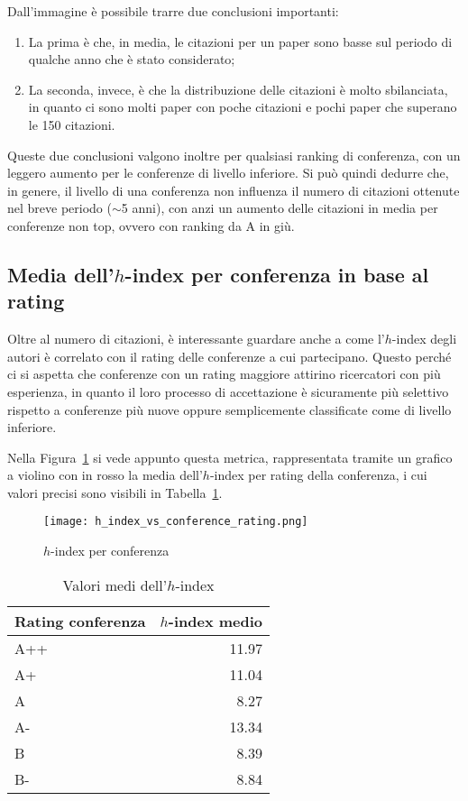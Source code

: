 Dall'immagine è possibile trarre due conclusioni importanti:
\begin{enumerate}
  \item La prima è che, in media, le citazioni per un paper sono basse sul
        periodo di qualche anno che è stato considerato;
  \item La seconda, invece, è che la distribuzione delle citazioni è molto sbilanciata,
        in quanto ci sono molti paper con poche citazioni e pochi paper che superano
        le 150 citazioni.
\end{enumerate}

Queste due conclusioni valgono inoltre per qualsiasi ranking di conferenza,
con un leggero aumento per le conferenze di livello inferiore.
Si può quindi dedurre che, in genere, il livello di una conferenza non influenza
il numero di citazioni ottenute nel breve periodo ($\sim$5 anni), con anzi
un aumento delle citazioni in media per conferenze non top, ovvero con ranking
da A in giù.

\subsection{Media dell'$h$-index per conferenza in base al rating}

Oltre al numero di citazioni, è interessante guardare anche
a come l'$h$-index degli autori è correlato con il rating delle conferenze
a cui partecipano. Questo perché ci si aspetta che conferenze con un rating
maggiore attirino ricercatori con più esperienza, in quanto il loro
processo di accettazione è sicuramente più selettivo rispetto a conferenze
più nuove oppure semplicemente classificate come di livello inferiore.

Nella Figura~\ref{fig:h-index-vs-rating} si vede appunto questa metrica,
rappresentata tramite un grafico a violino con in rosso la media dell'$h$-index
per rating della conferenza, i cui valori precisi sono visibili in
Tabella~\ref{table:h-index-vs-rating}.

\begin{figure}[tb]
  \centering
  \texttt{[image: h\_index\_vs\_conference\_rating.png]}
  \caption{$h$-index per conferenza}
  \label{fig:h-index-vs-rating}
\end{figure}

\begin{table}[tb]
  \centering
  \begin{tabular}{||l|r||}
    \hline
    \textbf{Rating conferenza} & \textbf{$h$-index medio} \\ [0.5ex] 
    \hline\hline
    A++    & 11.97 \\ \hline
    A+     & 11.04 \\ \hline
    A      & 8.27  \\ \hline
    A-     & 13.34 \\ \hline
    B      & 8.39 \\ \hline
    B-     & 8.84 \\ \hline
  \end{tabular}
  \caption{Valori medi dell'$h$-index}
  \label{table:h-index-vs-rating}
\end{table}

